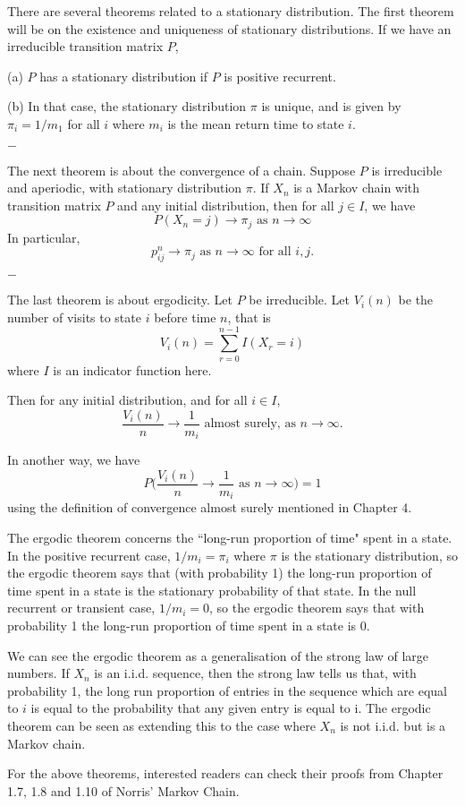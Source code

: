 \documentclass[11pt, a4paper, oneside]{book}
\theoremstyle{definition}
\newcommand{\breaking}{%
    \begin{center}
    $-$
    \end{center}%
}
\begin{document}
\noindent There are several theorems related to a stationary distribution. The first theorem will be on the existence and uniqueness of stationary distributions. If we have an irreducible transition matrix $P$, 

(a) $P$ has a stationary distribution if $P$ is positive recurrent. 

(b) In that case, the stationary distribution $\pi$ is unique, and is given by $\pi_i = 1/m_1$ for all $i$ where $m_i$ is the mean return time to state $i$. 

\breaking 

\noindent The next theorem is about the convergence of a chain. Suppose $P$ is irreducible and aperiodic, with stationary distribution $\pi$. If $X_n$ is a Markov chain with transition matrix $P$ and any initial distribution, then for all $j \in I$, we have \[
P(X_n = j) \to \pi_j \text{ as } n \to \infty
\]
In particular, \[
p_{ij}^n\to \pi_j \text{ as } n \to \infty \text{ for all } i, j.
\]

\breaking

\noindent The last theorem is about ergodicity. Let $P$ be irreducible. Let $V_i(n)$ be the number of visits to state $i$ before time $n$, that is \[
V_i(n) = \sum_{r = 0}^{n-1} I(X_r = i)
\]
where $I$ is an indicator function here. 

\noindent Then for any initial distribution, and for all $i \in I$, \[
\frac{V_i(n)}{n} \to \frac{1}{m_i} \text{ almost surely, as } n \to \infty.
\]

\noindent In another way, we have \[
P\Big( \frac{V_i(n)}{n} \to \frac{1}{m_i} \text{ as } n \to \infty \Big) = 1
\]
using the definition of convergence almost surely mentioned in Chapter 4.

\noindent The ergodic theorem concerns the ``long-run proportion of time" spent in a state. In the positive recurrent case, $1/m_i = \pi_i$ where $\pi$ is the stationary distribution, so the ergodic theorem says that (with probability 1) the long-run proportion of time spent in a state is the stationary probability of that state. In the null recurrent or transient case, $1/m_i = 0$, so the ergodic theorem says that with probability 1 the long-run proportion of time spent in a state is 0. 

\noindent We can see the ergodic theorem as a generalisation of the strong law of large numbers. If $X_n$ is an i.i.d. sequence, then the strong law tells us that, with probability 1, the long run proportion of entries in the sequence which are equal to $i$ is equal to the probability that any given entry is equal to i. The ergodic theorem can be seen as extending this to the case where $X_n$ is not i.i.d. but is a Markov chain.

\noindent For the above theorems, interested readers can check their proofs from Chapter 1.7, 1.8 and 1.10 of Norris' Markov Chain.


\backmatter
\end{document}
